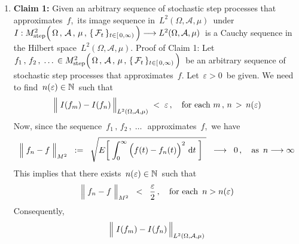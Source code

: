 \proof
\begin{enumerate}
\item
	\textbf{Claim 1:}\quad
	Given an arbitrary sequence of stochastic step processes that approximates \,$f$,\,
	its image sequence in \,$L^{2}(\Omega,\mathcal{A},\mu)$\, under
	\,$I : M^{2}_{\textnormal{step}}\!
	\left(\,
		\overset{{\color{white}.}}{\Omega} \,,\, \mathcal{A} \,,\, \mu \,,\, \{\,\mathcal{F}_{t}\,\}_{t \in [\,0,\infty)}
		\,\right)\longrightarrow L^{2}(\Omega,\mathcal{A},\mu)$\,
	is a Cauchy sequence in the Hilbert space \,$L^{2}(\Omega,\mathcal{A},\mu)$.
	\vskip 0.2cm
	\noindent
	Proof of Claim 1:\quad
	Let
	\,$f_{1}\,,\, f_{2}\,,\; \ldots\, \in M^{2}_{\textnormal{step}}\!
	\left(\,
		\overset{{\color{white}.}}{\Omega} \,,\, \mathcal{A} \,,\, \mu \,,\, \{\,\mathcal{F}_{t}\,\}_{t \in [\,0,\infty)}
		\,\right)$\,
	be an arbitrary sequence of stochastic step processes that approximates \,$f$.
	Let \,$\varepsilon > 0$\, be given.
	We need to find \,$n(\varepsilon) \in \mathbb{N}$\, such that
	\begin{equation*}
	\left\Vert\; I(f_{m}) \overset{{\color{white}.}}{-} I(f_{n}) \,\right\Vert_{L^{2}(\Omega,\mathcal{A},\mu)} \; < \; \varepsilon\,,
	\quad\textnormal{for each $m \,,\, n \, > \, n(\varepsilon)$}
	\end{equation*}
	Now, since the sequence \,$f_{1}\,,\, f_{2}\,,\; \ldots\,$\, approximates \,$f$,\,
	we have
	\begin{equation*}
	\left\Vert\; f_{n} \overset{{\color{white}.}}{-} f \;\right\Vert_{M^{2}}
	\;\; := \;\;
	\sqrt{E\!\left[\;\int_{0}^{\infty}\left(f(t)\overset{{\color{white}.}}{-}f_{n}(t)\right)^{2}\,\d t\;\right]{\color{white}.}}
	\;\; \longrightarrow \;\; 0\,,
	\quad
	\textnormal{as \,$n \longrightarrow \infty$}
	\end{equation*}
	This implies that there exists \,$n(\varepsilon) \in \mathbb{N}$\, such that
	\begin{equation*}
	\left\Vert\; f_{n} \overset{{\color{white}.}}{-} f \;\right\Vert_{M^{2}}
	\;\; < \;\;
		\dfrac{\varepsilon}{2}\,,
	\quad
	\textnormal{for each \,$n > n(\varepsilon)$}
	\end{equation*}
	Consequently,
	\begin{eqnarray*}
	\left\Vert\; I(f_{m}) \overset{{\color{white}.}}{-} I(f_{n}) \,\right\Vert_{L^{2}(\Omega,\mathcal{A},\mu)}

\end{eqnarray*}
\end{enumerate}
